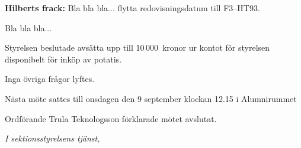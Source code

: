 \documentclass[protokoll]{fclass}
\begin{document}
\textbf{Hilberts frack:} Bla bla bla...
\batt
flytta redovisningsdatum till F3--HT93.
\eatt




Bla bla bla...

Styrelsen beslutade
\batt
avsätta upp till 10\,000~kronor ur kontot för styrelsen disponibelt för inköp av potatis.
\eatt



Inga övriga frågor lyftes.




Nästa möte sattes till onsdagen den 9 september klockan 12.15 i Alumnirummet


Ordförande Trula Teknologsson förklarade mötet avslutat.


\vspace{10mm}


\begin{signblock}

\emph{I sektionsstyrelsens tjänst,}


\end{signblock}


%
\end{document}
